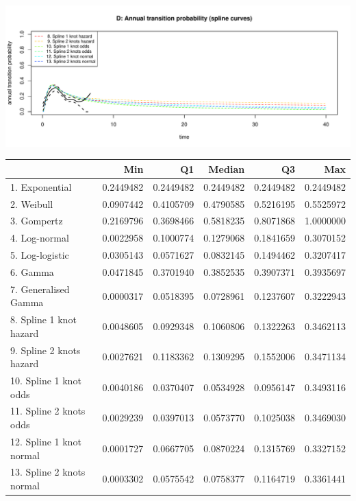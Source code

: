 \documentclass[]{article}
\begin{document}
\begin{flushleft}\includegraphics[height=0.29\textheight]{images/validate_extrapolation3-4} \end{flushleft}

\begin{tabular}{lrrrrr}
\toprule
  & Min & Q1 & Median & Q3 & Max\\
\midrule
\rowcolor{gray!6}  1. Exponential & 0.2449482 & 0.2449482 & 0.2449482 & 0.2449482 & 0.2449482\\
2. Weibull & 0.0907442 & 0.4105709 & 0.4790585 & 0.5216195 & 0.5525972\\
\rowcolor{gray!6}  3. Gompertz & 0.2169796 & 0.3698466 & 0.5818235 & 0.8071868 & 1.0000000\\
4. Log-normal & 0.0022958 & 0.1000774 & 0.1279068 & 0.1841659 & 0.3070152\\
\rowcolor{gray!6}  5. Log-logistic & 0.0305143 & 0.0571627 & 0.0832145 & 0.1494462 & 0.3207417\\
6. Gamma & 0.0471845 & 0.3701940 & 0.3852535 & 0.3907371 & 0.3935697\\
\rowcolor{gray!6}  7. Generalised Gamma & 0.0000317 & 0.0518395 & 0.0728961 & 0.1237607 & 0.3222943\\
8. Spline 1 knot hazard & 0.0048605 & 0.0929348 & 0.1060806 & 0.1322263 & 0.3462113\\
\rowcolor{gray!6}  9. Spline 2 knots hazard & 0.0027621 & 0.1183362 & 0.1309295 & 0.1552006 & 0.3471134\\
10. Spline 1 knot odds & 0.0040186 & 0.0370407 & 0.0534928 & 0.0956147 & 0.3493116\\
\rowcolor{gray!6}  11. Spline 2 knots odds & 0.0029239 & 0.0397013 & 0.0573770 & 0.1025038 & 0.3469030\\
12. Spline 1 knot normal & 0.0001727 & 0.0667705 & 0.0870224 & 0.1315769 & 0.3327152\\
\rowcolor{gray!6}  13. Spline 2 knots normal & 0.0003302 & 0.0575542 & 0.0758377 & 0.1164719 & 0.3361441\\
\bottomrule
\end{tabular}
\end{document}
